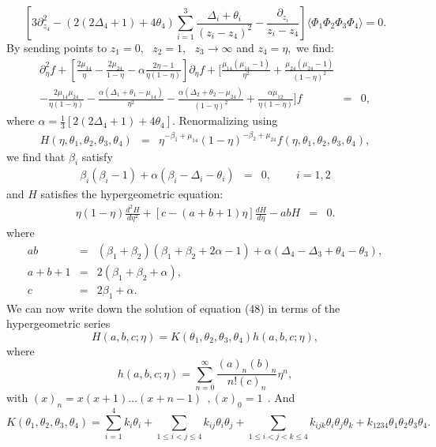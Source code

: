 \documentclass[a4paper,11pt]{article}
\begin{document}
\begin{equation}
\left[3\partial_{z_{4}}^{2}-(2(2\Delta_{4}+1)+4\theta_{4})
\sum_{i=1}^{3}\frac{\Delta_{i}+\theta_{i}}{(z_{i}-z_{4})^{2}}
-\frac{\partial_{z_{i}}}{z_{i}-z_{4}}\right]\langle\Phi_{1}
\Phi_{2}\Phi_{3}\Phi_{4}\rangle=0 .
\end{equation}
By sending points to
$z_{1}=0,\:\:\:z_{2}=1,\:\:\:z_{3}\longrightarrow\infty$ and
$z_{4}=\eta, $ we find:
\begin{eqnarray}
\partial_{\eta}^{2}f+[\frac{2\mu_{14}}{\eta}-\frac{2\mu_{24}}
{1-\eta}-\alpha\frac{2\eta-1}{\eta(1-\eta)}]\partial_{\eta}f
+[\frac{\mu_{14}(\mu_{14}-1)}{\eta^{2}}+\frac{\mu_{24}(\mu_{24}-1)}
{(1-\eta)^{2}}\nonumber\\
-\frac{2\mu_{14}\mu_{24}}{\eta(1-\eta)}-\frac{\alpha(\Delta_{1}+
\theta_{1}-\mu_{14})}{\eta^{2}}-\frac{\alpha(\Delta_{2}+\theta_{2}
-\mu_{24})}{(1-\eta)^{2}}+\frac{\alpha\mu_{12}}{\eta(1-\eta)}]f&=&0
,
\end{eqnarray}
where $\alpha=\frac{1}{3}\left[2(2\Delta_{4}+1)
+4\theta_{4}\right]$. Renormalizing using
\begin{eqnarray}
H(\eta,\theta_{1},\theta_{2},\theta_{3},
\theta_{4})&=&\eta^{-\beta_{1}+\mu_{14}}(1-\eta)^{-\beta_{2}+\mu_{24}}f(\eta,\theta_{1},\theta_{2},\theta_{3},
\theta_{4}) ,
\end{eqnarray}
we find that $\beta_{i}$ satisfy
\begin{eqnarray}
\beta_{i}(\beta_{i}-1)+\alpha(\beta_{i}-
\Delta_{i}-\theta_{i})&=&0 ,\:\:\:\:\:\:\:\:\:\:i=1,2
\end{eqnarray}
and $H$ satisfies the hypergeometric equation:
\begin{eqnarray}
\eta(1-\eta)\frac{d^{2}H}{d\eta^{2}}+[c-(a+b+1)\eta]\frac{d
H}{d\eta}- a b H&=&0 .
\end{eqnarray}
where
\begin{eqnarray}
ab&=&(\beta_{1}+\beta_{2})(\beta_{1}+
\beta_{2}+2\alpha-1)+\alpha(\Delta_{4}-
\Delta_{3}+\theta_{4}-\theta_{3}) ,\nonumber\\
a+b+1&=&2(\beta_{1}+\beta_{2}+\alpha) ,\nonumber\\
c&=&2\beta_{1}+\alpha .
\end{eqnarray}
We can now write down the solution of equation (48) in terms of
the hypergeometric series
\begin{equation}
H(a,b,c;\eta)=K(\theta_{1},\theta_{2},\theta_{3},\theta_{4})h(a,b,c;\eta),
\end{equation}
where
\begin{equation}
 h(a,b,c;\eta)=\sum_{n=0}^{\infty}\frac{(a)_{n}(b)_{n}}{n!(c)_{n}}\eta^{n} ,
\end{equation}
with $ (x)_{n}=x(x+1)\ldots(x+n-1)\:\:,(x)_{0}=1\:\:.$ And
\begin{equation}
K(\theta_{1},\theta_{2},\theta_{3},\theta_{4})=
\sum_{i=1}^{4}k_{i}\theta_{i}+\sum_{1\leq
i<j\leq4}k_{ij}\theta_{i}\theta_{j}+ \sum_{1\leq
i<j<k\leq4}k_{ijk}\theta_{i}\theta_{j}\theta_{k}+k_{1234}
\theta_{1}\theta_{2}\theta_{3}\theta_{4}.
\end{equation}
\end{document}

